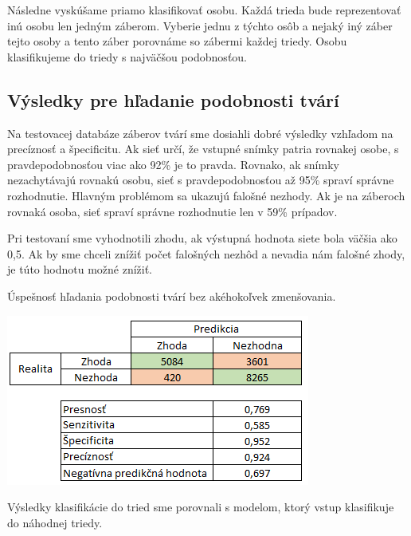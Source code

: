 Následne vyskúšame priamo klasifikovať osobu.
Každá trieda bude reprezentovať inú osobu len jedným záberom.
Vyberie jednu z týchto osôb a nejaký iný záber tejto osoby a tento záber porovnáme so zábermi každej triedy.
Osobu klasifikujeme do triedy s najväčšou podobnosťou.

\subsection{Výsledky pre hľadanie podobnosti tvárí}

Na testovacej databáze záberov tvárí sme dosiahli dobré výsledky vzhľadom na precíznosť a špecificitu.
Ak sieť určí, že vstupné snímky patria rovnakej osobe, s pravdepodobnosťou viac ako 92\% je to pravda.
Rovnako, ak snímky nezachytávajú rovnakú osobu, sieť s pravdepodobnosťou až 95\% spraví správne rozhodnutie.
Hlavným problémom sa ukazujú falošné nezhody.
Ak je na záberoch rovnaká osoba, sieť spraví správne rozhodnutie len v 59\% prípadov.

Pri testovaní sme vyhodnotili zhodu, ak výstupná hodnota siete bola väčšia ako 0,5. 
Ak by sme chceli znížiť počet falošných nezhôd a nevadia nám falošné zhody, je túto hodnotu možné znížiť.


\begin{table}[H]
  \caption[Úspešnosť hľadania podobnosti tvárí]{Úspešnosť hľadania podobnosti tvárí bez akéhokoľvek zmenšovania.}
  \label{tbl:face1_table}
  \begin{center}
  \includegraphics{images/face1_table}
  \end{center}
\end{table}

Výsledky klasifikácie do tried sme porovnali s modelom, ktorý vstup klasifikuje do náhodnej triedy.

